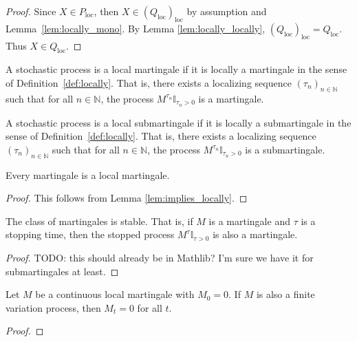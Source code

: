 \begin{proof}
Since $X \in P_{\mathrm{loc}}$, then $X \in (Q_{\mathrm{loc}})_{\mathrm{loc}}$ by assumption and Lemma~\ref{lem:locally_mono}.
By Lemma \ref{lem:locally_locally}, $(Q_{\mathrm{loc}})_{\mathrm{loc}} = Q_{\mathrm{loc}}$.
Thus $X \in Q_{\mathrm{loc}}$.
\end{proof}


\begin{definition}\label{def:IsLocalMartingale}
A stochastic process is a local martingale if it is locally a martingale in the sense of Definition~\ref{def:locally}.
That is, there exists a localizing sequence $(\tau_n)_{n \in \mathbb{N}}$ such that for all $n \in \mathbb{N}$, the process $M^{\tau_n}\mathbb{I}_{\tau_n > 0}$ is a martingale.
\end{definition}


\begin{definition}\label{def:IsLocalSubmartingale}
A stochastic process is a local submartingale if it is locally a submartingale in the sense of Definition~\ref{def:locally}.
That is, there exists a localizing sequence $(\tau_n)_{n \in \mathbb{N}}$ such that for all $n \in \mathbb{N}$, the process $M^{\tau_n}\mathbb{I}_{\tau_n > 0}$ is a submartingale.
\end{definition}


\begin{lemma}\label{lem:Martingale.IsLocalMartingale}
Every martingale is a local martingale.
\end{lemma}

\begin{proof}
This follows from Lemma \ref{lem:implies_locally}.
\end{proof}


\begin{lemma}\label{lem:stable_IsMartingale}
The class of martingales is stable. That is, if $M$ is a martingale and $\tau$ is a stopping time, then the stopped process $M^{\tau}\mathbb{I}_{\tau > 0}$ is also a martingale.
\end{lemma}

\begin{proof}
TODO: this should already be in Mathlib? I'm sure we have it for submartingales at least.
\end{proof}


\begin{theorem}\label{thm:IsLocalMartingale.eq_zero_of_finiteVariation}
Let $M$ be a continuous local martingale with $M_0 = 0$. If $M$ is also a finite variation process, then $M_t = 0$ for all $t$.
\end{theorem}

\begin{proof}

\end{proof}
